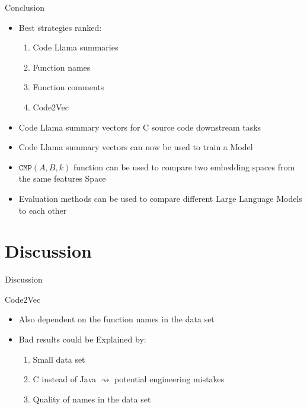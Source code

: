 \documentclass[aspectratio=1610,12pt]{beamer}
\begin{document}
\begin{frame}{Conclusion}
  \begin{itemize}
    \item Best strategies ranked: 
    \begin{enumerate}
      \item Code Llama summaries
      \item Function names
      \item Function comments
      \item Code2Vec
    \end{enumerate}
    \item Code Llama summary vectors for 
      C source code downstream tasks
    \item Code Llama summary vectors can now 
      be used to train a Model
  \item $\texttt{CMP}(A,B,k)$ function
    can be used to compare two embedding 
    spaces from the same features Space
  \item Evaluation methods can be used to 
    compare different Large Language Models to each other
  \end{itemize}
\end{frame}

\appendix
\section{Discussion}
\begin{frame}{Discussion}

\end{frame}

\begin{frame}{Code2Vec}
  \begin{itemize}
    \item Also dependent on the function names in the data set
    \item Bad results could be Explained by:
      \begin{enumerate}
        \item Small data set
        \item C instead of Java $\rightsquigarrow$ potential engineering mistakes
        \item Quality of names in the data set
      \end{enumerate}
  \end{itemize}
\end{frame}
\end{document}
